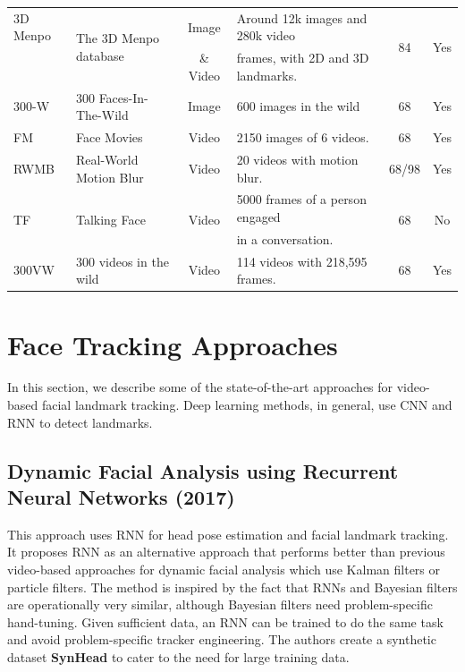 \documentclass{llncs}
\begin{document}
\begin{table}[]
\begin{center}
\begin{tabular}{|l|l|c|l|c|c|}
				3D Menpo & \multirow{2}{*}{The 3D Menpo database} & Image & Around 12k images and 280k video & \multirow{2}{*}{84} & \multirow{2}{*}{Yes} \\
				\cite{3d_menpo} & & \& Video & frames, with 2D and 3D landmarks. & & \\
				\hline
				
				300-W\cite{300-W} & 300 Faces-In-The-Wild & Image & 600 images in the wild & 68 & Yes \\
				\hline
				
				FM\cite{fm} & Face Movies & Video & 2150 images of 6 videos. & 68 & Yes \\
				\hline
				
				RWMB\cite{fab} & Real-World Motion Blur & Video & 20 videos with motion blur. & 68/98 & Yes \\
				\hline
				
				\multirow{2}{*}{TF\cite{tf}} & \multirow{2}{*}{Talking Face} & \multirow{2}{*}{Video} & 5000 frames of a person engaged & \multirow{2}{*}{68} & \multirow{2}{*}{No} \\
				& & & in a conversation. & & \\
				\hline
				
				300VW\cite{300-VW} & 300 videos in the wild & Video & 114 videos with 218,595 frames. & 68 & Yes \\
				\hline
			\end{tabular}
			\label{datasets}
		\end{center}
	\end{table}
	\vspace{-13mm}
	\section{Face Tracking Approaches}
	In this section, we describe some of the state-of-the-art approaches for video-based facial landmark tracking. Deep learning methods, in general, use CNN and RNN to detect landmarks.
	
	\subsection{Dynamic Facial Analysis using Recurrent Neural Networks (2017) \cite{dynamic_facial_analysis}}
This approach uses RNN for head pose estimation and facial landmark tracking.
It proposes RNN as an alternative approach that performs better than previous video-based approaches for dynamic facial analysis which use Kalman filters or particle filters. The method is inspired by the fact that RNNs and Bayesian filters are operationally very similar, although Bayesian filters need problem-specific hand-tuning. Given sufficient data, an RNN can be trained to do the same task and avoid problem-specific tracker engineering.
The authors create a synthetic dataset \textbf{SynHead} to cater to the need for large training data.
\end{document}
